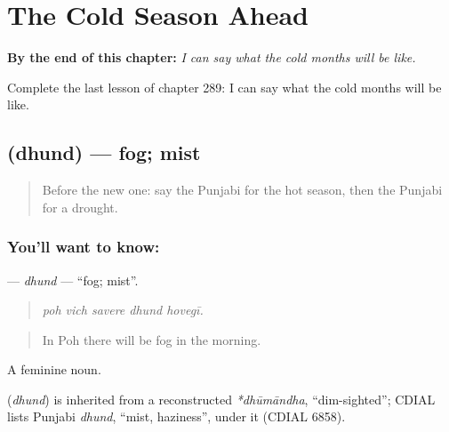 
\chapter{The Cold Season Ahead}
\label{ch:pa-a2-the-cold-season-ahead}

\begin{chapteropening}
\textbf{By the end of this chapter:} \emph{I can say what the cold months will be like.}

Complete the last lesson of chapter 289: I can say what the cold months will be like.
\end{chapteropening}

\section[\texorpdfstring{\pa{ਧੁੰਦ} (dhund)}{ਧੁੰਦ (dhund)}]{ (dhund) — fog; mist}

\label{lesson:PA-C289-dhund}



\begin{quote}
Before the new one: say the Punjabi for the hot season, then the Punjabi for a drought.
\end{quote}

\subsection*{You'll want to know: }
\textbf{} — \emph{dhund} — \textquotedblleft{}fog; mist\textquotedblright{}.

\begin{quote}
    
\end{quote}

\begin{quote}
\emph{poh vich savere dhund hovegī.}
\end{quote}

\begin{quote}
In Poh there will be fog in the morning.
\end{quote}

A feminine noun.

\begin{cousinweb}
\textbf{} (\emph{dhund}) is inherited from a reconstructed \emph{*dhūmāndha}, \textquotedblleft{}dim-sighted\textquotedblright{}; CDIAL lists Punjabi \emph{dhund}, \textquotedblleft{}mist, haziness\textquotedblright{}, under it (CDIAL 6858).
\end{cousinweb}

